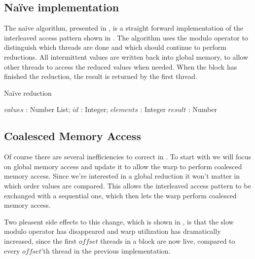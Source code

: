 \subsection{Naïve implementation}

The naïve algorithm, presented in , is a
straight forward implementation of the interleaved access pattern
shown in . The algorithm uses the modulo operator
to distinguish which threads are done and which should continue to
perform reductions. All intermittent values are written back into
global memory, to allow other threads to access the reduced values
when needed. When the block has finished the reduction, the result
is returned by the first thread.

\begin{algorithm}
  \caption{Naïve reduction}
  \label{alg:naiveReduct}
  \begin{algorithmic}
              {$values$ : Number List; $id$ : Integer; $elements$ : Integer}
              {$result$ : Number}
              {
                  \ENDIF
                  \SYNC
                \ENDWHILE
                \ENDIF
              }
  \end{algorithmic}
\end{algorithm}

\subsection{Coalesced Memory Access}

Of course there are several inefficiencies to correct in
. To start with we will focus on global memory access
and update it to allow the warp to perform coalesced memory access. Since we're
interested in a global reduction it won't matter in which order values are
compared. This allows the interleaved access pattern to be exchanged with a
sequential one, which then lets the warp perform coalesced memory access.


Two pleasent side effects to this change, which is shown in
, is that the slow modulo operator has disappeared
and warp utilization has dramatically increased, since the first $offset$
threads in a block are now live, compared to every $offset$'th thread in the
previous implementation.

